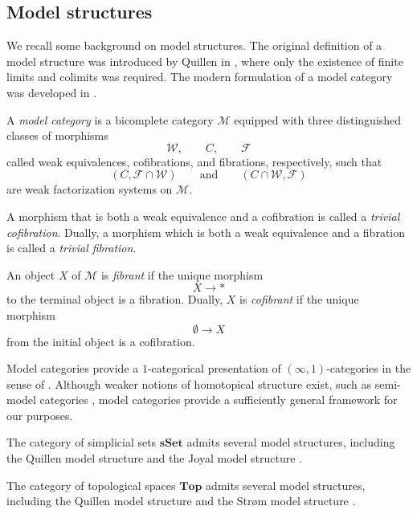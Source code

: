 \documentclass{tac}
\begin{document}
\subsection*{Model structures}
We recall some background on model structures. The original definition of a model
structure was introduced by Quillen in \cite{Quillen67}, where only the
existence of finite limits and colimits was required. The modern formulation of
a model category was developed in \cite{DwyerHirschhornKan1997}.

\begin{definition}
A \emph{model category} is a bicomplete category $\mathcal{M}$ equipped with
three distinguished classes of morphisms
\[
\mathcal{W},\qquad C,\qquad \mathcal{F}
\]
called weak equivalences, cofibrations, and fibrations, respectively, such that
\[
(C,\mathcal{F}\cap\mathcal{W})
\qquad\text{and}\qquad
(C\cap\mathcal{W},\mathcal{F})
\]
are weak factorization systems on $\mathcal{M}$.
\end{definition}

A morphism that is both a weak equivalence and a cofibration is called a
\emph{trivial cofibration}. Dually, a morphism which is both a weak equivalence
and a fibration is called a \emph{trivial fibration}.

An object $X$ of $\mathcal{M}$ is \emph{fibrant} if the unique morphism
\[
X\longrightarrow *
\]
to the terminal object is a fibration. Dually, $X$ is \emph{cofibrant} if the
unique morphism
\[
\emptyset\longrightarrow X
\]
from the initial object is a cofibration.

Model categories provide a $1$-categorical presentation of
$(\infty,1)$-categories in the sense of \cite{RiehlVerity2020}. Although weaker
notions of homotopical structure exist, such as semi-model categories
\cite{hov3}, model categories provide a sufficiently general framework for our
purposes.

\begin{example}
The category of simplicial sets $\mathbf{sSet}$ admits several model
structures, including the Quillen model structure \cite{JarGo} and the Joyal
model structure \cite{Joyal1}.
\end{example}

\begin{example}
The category of topological spaces $\mathbf{Top}$ admits several model
structures, including the Quillen model structure \cite{Quillen67} and the
Strøm model structure \cite{Strom}.
\end{example}
\end{document}
